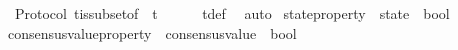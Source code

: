 \begin{isabellebody}
\isanewline
{}\isamarkupfalse%
\ {\isacharparenleft}\ Protocol{\isacharparenright}\ {\isasymSigma}t{\isacharunderscore}is{\isacharunderscore}subset{\isacharunderscore}of{\isacharunderscore}{\isasymSigma}\ {\isacharcolon}\ {\isachardoublequoteopen}{\isasymSigma}t\ {\isasymsubseteq}\ {\isasymSigma}{\isachardoublequoteclose}\isanewline
%
\isadelimproof
\ \ %
\endisadelimproof
%
\isatagproof
{}\isamarkupfalse%
\ {\isasymSigma}t{\isacharunderscore}def\ \isamarkupfalse%
\ auto%
\endisatagproof
{\isafoldproof}%
%
\isadelimproof
\isanewline
%
\endisadelimproof
\isanewline
\isanewline
{}\isamarkupfalse%
\ state{\isacharunderscore}property\ {\isacharequal}\ {\isachardoublequoteopen}state\ {\isasymRightarrow}\ bool{\isachardoublequoteclose}\isanewline
\isanewline
\isanewline
{}\isamarkupfalse%
\ consensus{\isacharunderscore}value{\isacharunderscore}property\ {\isacharequal}\ {\isachardoublequoteopen}consensus{\isacharunderscore}value\ {\isasymRightarrow}\ bool{\isachardoublequoteclose}\isanewline
%
\isadelimtheory
\isanewline
%
\endisadelimtheory
%
\isatagtheory
{}\isamarkupfalse%
%
\endisatagtheory
{\isafoldtheory}%
%
\isadelimtheory
%
\endisadelimtheory
%
\end{isabellebody}%
\endinput
